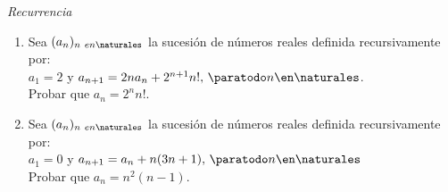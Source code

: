 \textit{Recurrencia}

\ejercicio

\begin{enumerate}[label=\roman*)]
	\item
	      Sea $(a_n)_{n\ en \naturales}$ la sucesión de números reales definida recursivamente por:\\
	      $a_1 = 2$ y $a_{n+1} = 2 n a_n+ 2^{n+1}n!,\, \paratodo n \en \naturales$.\\
	      Probar que $a_n = 2^n n!$.\\

	\item
	      Sea $(a_n)_{n\ en \naturales}$ la sucesión de números reales definida recursivamente por:\\
	      $a_1 = 0$ y $a_{n+1} = a_n + n(3n + 1),\, \paratodo n \en \naturales$\\
	      Probar que $a_n = n^2 (n-1)$.\\

\end{enumerate}

\separadorCorto
